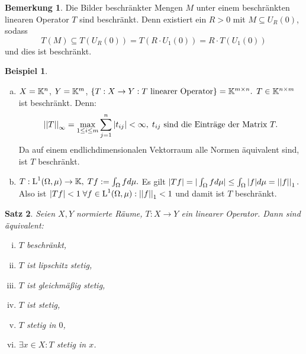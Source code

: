 \documentclass[ngerman]{report}
\theoremstyle{plain}%
\newtheorem{thm}{Satz}[chapter]
\theoremstyle{definition}%
\newtheorem{bsp}[thm]{Beispiel}
\theoremstyle{myStyle}
\newtheorem*{bem*}{Bemerkung}
\begin{document}
	\begin{bem*} 
	Die Bilder beschränkter Mengen $M$ unter einem beschränkten linearen Operator $T$ sind beschränkt. Denn existiert ein $R>0$ mit $M \subseteq  U_R(0)$, sodass 
		$$T(M) \subseteq T(U_R(0))=T(R\cdot U_1(0))=R\cdot T(U_1(0))$$
		und dies ist beschränkt.
	\end{bem*}

	\begin{bsp}
		\begin{enumerate}[a)]
			\item $X = \mathbb{K}^n$, $Y = \mathbb{K}^m$, $\{T: X\to Y: T \text{ linearer Operator}\} = \mathbb{K}^{m \times n}.$ $T\in\mathbb{K}^{n \times m}$ ist beschränkt. 
			Denn: 
			$$\left\lvert \left\lvert T \right\rvert \right\rvert_\infty = \max_{1\leq i \leq m} \sum^n_{j=1} |t_{ij}| < \infty,\; t_{ij} \text{ sind die Einträge der Matrix }T.$$ Da auf einem endlichdimensionalen Vektorraum alle Normen äquivalent sind, ist $T$ beschränkt.
			\item $T: \text{L}^{1}(\Omega,\mu) \to \mathbb{K}, \; Tf := \int_\Omega f d\mu.$ 
				Es gilt $|Tf| = |\int_\Omega f d\mu| \leq \int_\Omega |f| d\mu = \left\lvert \left\lvert f \right\rvert \right\rvert_1.$
				Also ist $|Tf| < 1 \; \forall f \in \text{L}^{1}(\Omega,\mu): \left\lvert \left\lvert f \right\rvert \right\rvert_1 < 1$ und damit ist $T$ beschränkt.
		\end{enumerate}
	\end{bsp}

	\begin{thm}
		Seien $X,Y$ normierte Räume, $T: X\to Y$ ein linearer Operator. Dann sind äquivalent:
			\begin{enumerate}[(i)]
				\item $T$ beschränkt,
				\item $T$ ist lipschitz stetig,
				\item $T$ ist gleichmäßig stetig,
				\item $T$ ist stetig,
				\item $T$ stetig in $0$,
				\item $\exists x \in X: T$ stetig in $x$.
			\end{enumerate}
	\end{thm}
\end{document}
